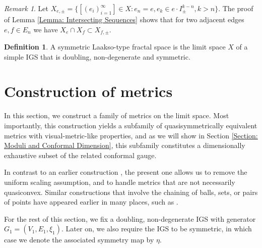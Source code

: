 \documentclass{amsart}
\numberwithin{equation}{section}
\theoremstyle{definition}
\newtheorem{definition}[equation]{Definition}
\theoremstyle{remark}
\newtheorem{remark}[equation]{Remark}
\begin{document}
\begin{remark}\label{rmk:intersection}
    Let $X_{e,\pm}=\{[(e_i)_{i=1}^\infty
] \in X: e_n = e, e_k \in e\cdot I^{k-n}_{\pm}, k>n\}$. The proof of Lemma \ref{Lemma: Intersecting Sequences} shows  that for two adjacent edges $e,f\in E_n$  we have $X_e \cap X_f \subset X_{f,\pm}$.
\end{remark}

\begin{definition}
    A symmetric Laakso-type fractal space is the limit space \(X\) of a simple IGS that is doubling, non-degenerate and symmetric.
\end{definition}



\section{Construction of metrics}\label{Section: Construction of Metrics}
In this section, we construct a family of metrics on the limit space. Most importantly, this construction yields a subfamily of quasisymmetrically equivalent metrics with visual-metric-like properties, and as we will show in Section \ref{Section: Moduli and Conformal Dimension}, this subfamily constitutes a dimensionally exhaustive subset of the related conformal gauge.

In contrast to an earlier construction \cite{anttila2024constructions}, the present one allows us to remove the uniform scaling assumption, and to handle metrics that are not necessarily quasiconvex. Similar constructions that involve the chaining of balls, sets, or pairs of points have appeared earlier in many places, such as  \cite{bonkmeyer, BonkSchramm, Carrasco, SemmesBilip}. 

For the rest of this section, we fix a doubling, non-degenerate IGS with generator \(G_1=(V_1,E_1,\xi_1)\). Later on, we also require the IGS to be symmetric, in which case we denote the associated symmetry map by \(\eta\).
\end{document}
